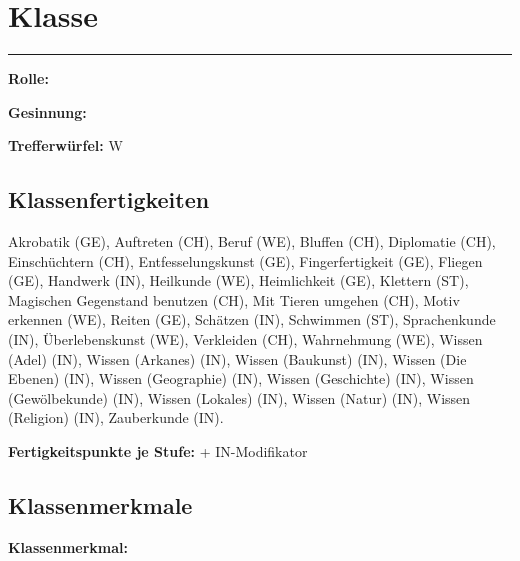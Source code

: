\documentclass[
	ngerman,
	a4paper,
	11pt,
	twocolumn,
]{scrartcl}
\begin{document}
\section*{Klasse}

\rule[2ex]{0.49\textwidth}{1pt}



\textbf{Rolle:}

\textbf{Gesinnung:} 

\textbf{Trefferwürfel:} W

\subsection*{Klassenfertigkeiten}

Akrobatik (GE), Auftreten (CH), Beruf (WE), Bluffen (CH), Diplomatie (CH), Einschüchtern (CH), Entfesselungskunst (GE), Fingerfertigkeit (GE), Fliegen (GE), Handwerk (IN), Heilkunde (WE), Heimlichkeit (GE), Klettern (ST), Magischen Gegenstand benutzen (CH), Mit Tieren umgehen (CH), Motiv erkennen (WE), Reiten (GE), Schätzen (IN), Schwimmen (ST), Sprachenkunde (IN), Überlebenskunst (WE), Verkleiden (CH), Wahrnehmung (WE), Wissen (Adel) (IN), Wissen (Arkanes) (IN), Wissen (Baukunst) (IN), Wissen (Die Ebenen) (IN), Wissen (Geographie) (IN), Wissen (Geschichte) (IN), Wissen (Gewölbekunde) (IN), Wissen (Lokales) (IN), Wissen (Natur) (IN), Wissen (Religion) (IN), Zauberkunde (IN).

\textbf{Fertigkeitspunkte je Stufe:}  + IN-Modifikator

\subsection*{Klassenmerkmale}

\textbf{Klassenmerkmal:}




	
\end{document}
